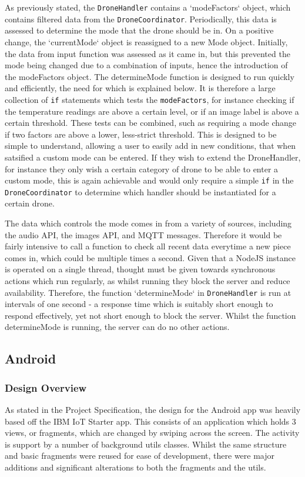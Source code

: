 \documentclass{article}
\begin{document}
As previously stated, the \texttt{DroneHandler} contains a `modeFactors` object, which contains filtered data from the \texttt{DroneCoordinator}. Periodically, this data is assessed to determine the mode that the drone should be in. On a positive change, the `currentMode` object is reassigned to a new Mode object. Initially, the data from input function was assessed as it came in, but this prevented the mode being changed due to a combination of inputs, hence the introduction of the modeFactors object. The determineMode function is designed to run quickly and efficiently, the need for which is explained below. It is therefore a large collection of \texttt{if} statements which tests the \texttt{modeFactors}, for instance checking if the temperature readings are above a certain level, or if an image label is above a certain threshold. These tests can be combined, such as requiring a mode change if two factors are above a lower, less-strict threshold. This is designed to be simple to understand, allowing a user to easily add in new conditions, that when satsified a custom mode can be entered. If they wish to extend the DroneHandler, for instance they only wish a certain category of drone to be able to enter a custom mode, this is again achievable and would only require a simple \texttt{if} in the \texttt{DroneCoordinator} to determine which handler should be instantiated for a certain drone.

The data which controls the mode comes in from a variety of sources, including the audio API, the images API, and MQTT messages. Therefore it would be fairly intensive to call a function to check all recent data everytime a new piece comes in, which could be multiple times a second. Given that a NodeJS instance is operated on a single thread, thought must be given towards synchronous actions which run regularly, as whilst running they block the server and reduce availability. Therefore, the function `determineMode` in \texttt{DroneHandler} is run at intervals of one second - a response time which is suitably short enough to respond effectively, yet not short enough to block the server. Whilst the function determineMode is running, the server can do no other actions.


\subsection{Android}
\subsubsection{Design Overview}
As stated in the Project Specification, the design for the Android app was heavily based off the IBM IoT Starter app\cite{iotStarterAndroid}. This consists of an application which holds 3 views, or fragments, which are changed by swiping across the screen. The activity is support by a number of background utils classes. Whilst the same structure and basic fragments were reused for ease of development, there were major additions and significant alterations to both the fragments and the utils. 
\end{document}
